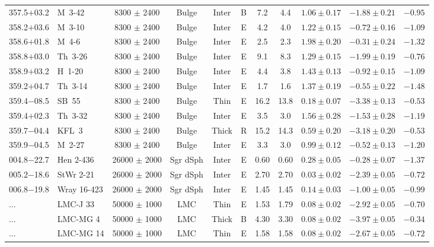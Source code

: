 \documentclass[useAMS]{mn2e}
\begin{document}
\begin{center}
{\begin{longtable}{llccccccccc}
357.5$+$03.2		&	M~3-42	&	8300 $\pm$ 2400		&	Bulge		&	Inter		&	B		&	7.2		&	4.4		&	$1.06 \pm 0.17$		&	$-1.88 \pm 0.21$		&	$-0.95$	\\
358.2$+$03.6		&	M~3-10	&	8300 $\pm$ 2400		&	Bulge		&	Inter		&	E		&	4.2		&	4.0		&	$1.22 \pm 0.15$		&	$-0.72 \pm 0.16$		&	$-1.09$	\\
358.6$+$01.8		&	M~4-6	&	8300 $\pm$ 2400		&	Bulge		&	Inter		&	E		&	2.5		&	2.3		&	$1.98 \pm 0.20$		&	$-0.31 \pm 0.24$		&	$-1.32$	\\
358.8$+$03.0		&	Th~3-26	&	8300 $\pm$ 2400		&	Bulge		&	Inter		&	E		&	9.1		&	8.3		&	$1.29 \pm 0.15$		&	$-1.99 \pm 0.19$		&	$-0.76$	\\
358.9$+$03.2		&	H~1-20	&	8300 $\pm$ 2400		&	Bulge		&	Inter		&	E		&	4.4		&	3.8		&	$1.43 \pm 0.13$		&	$-0.92 \pm 0.15$		&	$-1.09$	\\
359.2$+$04.7		&	Th~3-14	&	8300 $\pm$ 2400		&	Bulge		&	Inter		&	E		&	1.7		&	1.6		&	$1.37 \pm 0.19$		&	$-0.55 \pm 0.22$		&	$-1.48$	\\
359.4$-$08.5		&	SB~55	&	8300 $\pm$ 2400		&	Bulge		&	Thin		&	E		&	16.2		&	13.8		&	$0.18 \pm 0.07$		&	$-3.38 \pm 0.13$		&	$-0.53$	\\
359.4$+$02.3		&	Th~3-32	&	8300 $\pm$ 2400		&	Bulge		&	Inter		&	E		&	3.5		&	3.0		&	$1.56 \pm 0.28$		&	$-1.53 \pm 0.28$		&	$-1.19$	\\
359.7$-$04.4		&	KFL~3	&	8300 $\pm$ 2400		&	Bulge		&	Thick		&	R		&	15.2		&	14.3		&	$0.59 \pm 0.20$		&	$-3.18 \pm 0.20$		&	$-0.53$	\\
359.9$-$04.5		&	M~2-27	&	8300 $\pm$ 2400		&	Bulge		&	Inter		&	E		&	3.3		&	3.0		&	$0.99 \pm 0.12$		&	$-0.52 \pm 0.13$		&	$-1.20$	\\
\hline
004.8$-$22.7	&	Hen 2-436	&	26000 $\pm$ 2000	&	Sgr dSph	&	Inter	&	E	&	0.60	&	0.60	&	$0.28 \pm  0.05$	&	$-0.28 \pm 0.07$	&	$-1.37$	\\
005.2$-$18.6	&	StWr 2-21	&	26000 $\pm$ 2000	&	Sgr dSph	&	Inter	&	E	&	2.70	&	2.70	&	$0.03 \pm  0.02$	&	$-2.39 \pm 0.05$	&	$-0.72$	\\
006.8$-$19.8	&	Wray 16-423	&	26000 $\pm$ 2000	&	Sgr dSph	&	Inter	&	E	&	1.45	&	1.45	&	$0.14 \pm  0.03$	&	$-1.00 \pm 0.05$	&	$-0.99$	\\
\hline																						
$\ldots$	&	LMC-J 33	&	50000 $\pm$ 1000	&	LMC	&	Thin	&	E	&	1.53	&	1.79	&	$0.08 \pm  0.02$	&	$-2.92 \pm 0.05$	&	$-0.70$	\\
$\ldots$	&	LMC-MG 4	&	50000 $\pm$ 1000	&	LMC	&	Thick	&	B	&	4.30	&	3.30	&	$0.08 \pm  0.02$	&	$-3.97 \pm 0.05$	&	$-0.34$	\\
$\ldots$	&	LMC-MG 14	&	50000 $\pm$ 1000	&	LMC	&	Thin	&	E	&	1.58	&	1.58	&	$0.08 \pm  0.02$	&	$-2.67 \pm 0.05$	&	$-0.72$	\\

\end{longtable}}
\end{center}
\end{document}
